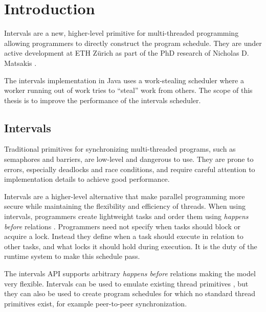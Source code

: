 
\chapter{Introduction}
\label{chap:introduction}

Intervals \cite{Matsakis2009a} are a new, higher-level primitive for
multi-threaded programming allowing programmers to directly construct
the program schedule. They are under active development at ETH Zürich
as part of the PhD research of Nicholas D. Matsakis
\cite{Matsakis2010}.

The intervals implementation in Java uses a work-stealing scheduler
where a worker running out of work tries to ``steal'' work from
others. The scope of this thesis is to improve the performance of the
intervals scheduler.


\section{Intervals}
\label{sec:intro-intervals}

Traditional primitives for synchronizing multi-threaded programs, such
as semaphores and barriers, are low-level and dangerous to use. They
are prone to errors, especially deadlocks and race conditions, and
require careful attention to implementation details to achieve good
performance.


Intervals are a higher-level alternative that make parallel
programming more secure while maintaining the flexibility and
efficiency of threads. When using intervals, programmers create
lightweight tasks and order them using \emph{happens before} relations
\cite{Lamport1978}. Programmers need not specify when tasks should
block or acquire a lock. Instead they define when a task should
execute in relation to other tasks, and what locks it should hold
during execution. It is the duty of the runtime system to make this
schedule pass.

The intervals API supports arbitrary \emph{happens before} relations
making the model very flexible. Intervals can be used to emulate
existing thread primitives \cite{Matsakis2009a}, but they can also be
used to create program schedules for which no standard thread
primitives exist, for example peer-to-peer synchronization.

